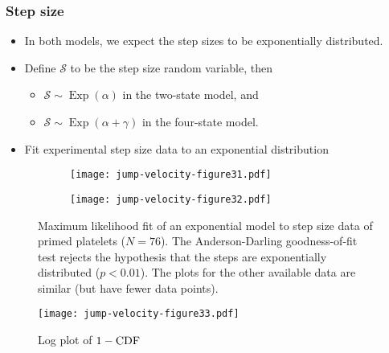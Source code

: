 \documentclass{beamer}
\newcommand{\tn}{\textnormal}
\DeclareMathOperator{\Exp}{Exp}
\begin{document}
\begin{frame}
  \frametitle{Step size}
  \begin{itemize}
  \item In both models, we expect the step sizes to be exponentially
    distributed.
  \item Define $\mathcal{S}$ to be the step size random variable, then
    \begin{itemize}
    \item $\mathcal{S} \sim \Exp(\alpha)$ in the two-state model, and
    \item $\mathcal{S} \sim \Exp(\alpha + \gamma)$ in the four-state model.
    \end{itemize}
  \item Fit experimental step size data to an exponential distribution
  \end{itemize}
\end{frame}

\begin{frame}
  \begin{figure}
    \centering
    \begin{subfigure}{0.48\textwidth}
      \texttt{[image: jump-velocity-figure31.pdf]}
    \end{subfigure}
    \hfill
    \begin{subfigure}{0.48\textwidth}
      \texttt{[image: jump-velocity-figure32.pdf]}
    \end{subfigure}
    \caption{Maximum likelihood fit of an exponential model to step
      size data of primed platelets ($N=76$). The Anderson-Darling
      goodness-of-fit test rejects the hypothesis that the steps are
      exponentially distributed ($p < 0.01$). The plots for the other
      available data are similar (but have fewer data points).}
    \label{fig:step-fit}
  \end{figure}
\end{frame}

\begin{frame}
  \begin{figure}
    \centering
    \texttt{[image: jump-velocity-figure33.pdf]}
    \caption{Log plot of $1 - \tn{CDF}$}
    \label{fig:log-cdf}
  \end{figure}
\end{frame}
\end{document}
